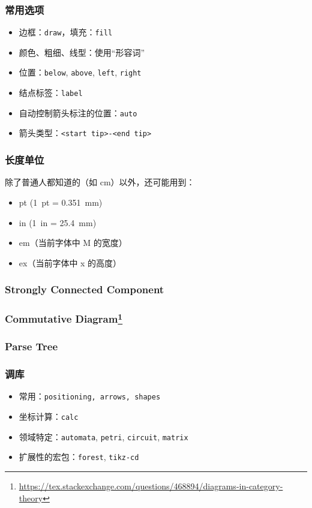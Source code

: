\documentclass[usenames,xcolor=svgnames,11pt,sans]{beamer}
\let\t\texttt
\begin{document}
\begin{frame}
    \frametitle{常用选项}

    \begin{itemize}
        \item 边框：\t{draw}，填充：\t{fill}
        \item 颜色、粗细、线型：使用“形容词”
        \item 位置：\t{below}, \t{above}, \t{left}, \t{right}
        \item 结点标签：\t{label}
        \item 自动控制箭头标注的位置：\t{auto}
        \item 箭头类型：\t{<start tip>-<end tip>}
    \end{itemize}
\end{frame}

\begin{frame}
    \frametitle{长度单位}

    除了普通人都知道的（如 \si{cm}）以外，还可能用到：
    \begin{itemize}
        \item \si{pt} (\SI{1}{pt} = \SI{0.351}{mm})
        \item \si{in} (\SI{1}{in} = \SI{25.4}{mm})
        \item \si{em}（当前字体中 M 的宽度）
        \item \si{ex}（当前字体中 x 的高度）
    \end{itemize}
\end{frame}

\begin{frame}
    \frametitle{Strongly Connected Component}

    \centering
\end{frame}

\begin{frame}
    \frametitle{Commutative Diagram\footnote{\url{https://tex.stackexchange.com/questions/468894/diagrams-in-category-theory}}}

    \centering
\end{frame}

\begin{frame}
    \frametitle{Parse Tree}

    \begin{center}
        \footnotesize
    \end{center}
\end{frame}

\begin{frame}
    \frametitle{调库}

    \begin{itemize}
        \item 常用：\t{positioning, arrows, shapes}
        \item 坐标计算：\t{calc}
        \item 领域特定：\t{automata}, \t{petri}, \t{circuit}, \t{matrix}
        \item 扩展性的宏包：\t{forest}, \t{tikz-cd}
    \end{itemize}
\end{frame}
\end{document}
